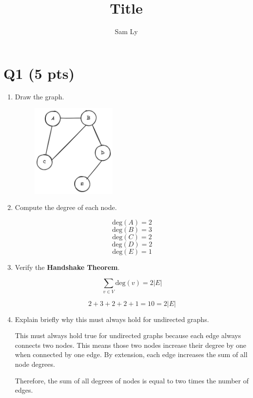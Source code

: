 \documentclass{article}
\title{Title}
\author{Sam Ly}
\begin{document}
\maketitle

\section*{Q1 (5 pts)}

\begin{enumerate}
    \item {
        Draw the graph.
        \begin{figure}[htbp]
            \centering
            \includegraphics[width=0.4\textwidth]{graph.png}
        \end{figure}
    }

    \item {
        Compute the degree of each node.

        \[ \text{deg}(A) = 2 \]
        \[ \text{deg}(B) = 3 \]
        \[ \text{deg}(C) = 2 \]
        \[ \text{deg}(D) = 2 \]
        \[ \text{deg}(E) = 1 \]
    }

    \item {
        Verify the \textbf{Handshake Theorem}.

        \[\sum_{v \in V}{\text{deg}(v)} = 2 |E| \]

        \[2+3+2+2+1 = 10 = 2 |E| \]
    }

    \item {
        Explain briefly why this must always hold for undirected graphs.

        This must always hold true for undirected graphs because each edge
        always connects two nodes. This means those two nodes increase their
        degree by one when connected by one edge. By extension, each edge 
        increases the sum of all node degrees. 

        Therefore, the sum of all degrees of nodes is equal to two times the 
        number of edges.
    }
\end{enumerate}
\end{document}

